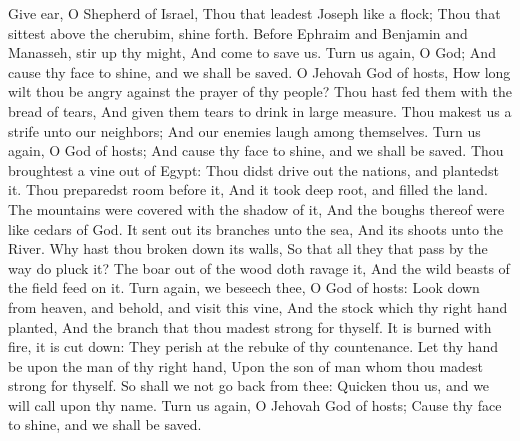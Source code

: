 Give ear, O Shepherd of Israel, Thou that leadest Joseph like a flock; Thou that sittest above the cherubim, shine forth.  Before Ephraim and Benjamin and Manasseh, stir up thy might, And come to save us.  Turn us again, O God; And cause thy face to shine, and we shall be saved.  O Jehovah God of hosts, How long wilt thou be angry against the prayer of thy people?  Thou hast fed them with the bread of tears, And given them tears to drink in large measure.  Thou makest us a strife unto our neighbors; And our enemies laugh among themselves.  Turn us again, O God of hosts; And cause thy face to shine, and we shall be saved.  Thou broughtest a vine out of Egypt: Thou didst drive out the nations, and plantedst it.  Thou preparedst room before it, And it took deep root, and filled the land.  The mountains were covered with the shadow of it, And the boughs thereof were like cedars of God.  It sent out its branches unto the sea, And its shoots unto the River.  Why hast thou broken down its walls, So that all they that pass by the way do pluck it?  The boar out of the wood doth ravage it, And the wild beasts of the field feed on it.  Turn again, we beseech thee, O God of hosts: Look down from heaven, and behold, and visit this vine,  And the stock which thy right hand planted, And the branch that thou madest strong for thyself.  It is burned with fire, it is cut down: They perish at the rebuke of thy countenance.  Let thy hand be upon the man of thy right hand, Upon the son of man whom thou madest strong for thyself.  So shall we not go back from thee: Quicken thou us, and we will call upon thy name.  Turn us again, O Jehovah God of hosts; Cause thy face to shine, and we shall be saved. 

